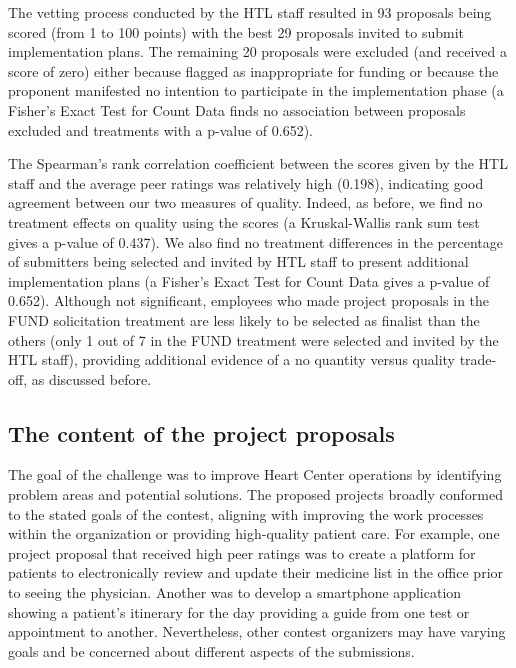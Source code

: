 \documentclass[12pt, titlepage]{article}
\begin{document}
The vetting process conducted by the HTL staff resulted in 93 proposals
being scored (from 1 to 100 points) with the best 29 proposals invited
to submit implementation plans. The remaining 20 proposals were excluded
(and received a score of zero) either because flagged as inappropriate
for funding or because the proponent manifested no intention to
participate in the implementation phase (a Fisher's Exact Test for Count
Data finds no association between proposals excluded and treatments with
a p-value of 0.652).

The Spearman's rank correlation coefficient between the scores given by
the HTL staff and the average peer ratings was relatively high (0.198),
indicating good agreement between our two measures of quality. Indeed,
as before, we find no treatment effects on quality using the scores (a
Kruskal-Wallis rank sum test gives a p-value of 0.437). We also find no
treatment differences in the percentage of submitters being selected and
invited by HTL staff to present additional implementation plans (a
Fisher's Exact Test for Count Data gives a p-value of 0.652). Although
not significant, employees who made project proposals in the FUND
solicitation treatment are less likely to be selected as finalist than
the others (only 1 out of 7 in the FUND treatment were selected and
invited by the HTL staff), providing additional evidence of a no
quantity versus quality trade-off, as discussed before.

\subsection{The content of the project
proposals}\label{the-content-of-the-project-proposals}

The goal of the challenge was to improve Heart Center operations by
identifying problem areas and potential solutions. The proposed projects
broadly conformed to the stated goals of the contest, aligning with
improving the work processes within the organization or providing
high-quality patient care. For example, one project proposal that
received high peer ratings was to create a platform for patients to
electronically review and update their medicine list in the office prior
to seeing the physician. Another was to develop a smartphone application
showing a patient's itinerary for the day providing a guide from one
test or appointment to another. Nevertheless, other contest organizers
may have varying goals and be concerned about different aspects of the
submissions.
\end{document}
